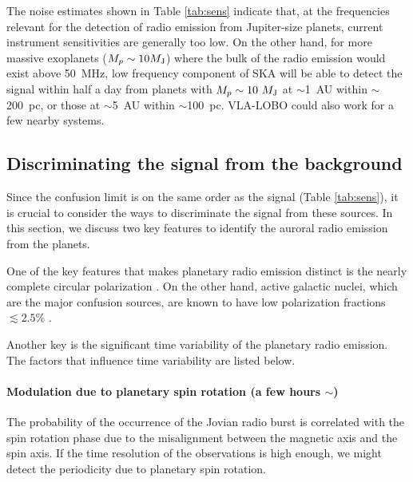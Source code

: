 \documentclass[iop,numberedappendix,apj]{emulateapj}
\begin{document}
The noise estimates shown in Table \ref{tab:sens} indicate that, at the frequencies relevant for the detection of radio emission from Jupiter-size planets, current instrument sensitivities are generally too low.
On the other hand, for more massive exoplanets ($M_p\sim 10 M_{\rm J}$) where the bulk of the radio emission would exist above 50~MHz, low frequency component of SKA will be able to detect the signal within half a day from planets with $M_p \sim 10~M_{\rm J}$ at $\sim$1~AU within $\sim $200~pc, or those at $\sim$5~AU within $\sim $100~pc. 
VLA-LOBO could also work for a few nearby systems. 




\subsection{Discriminating the signal from the background}
\label{ss:timevariability}


Since the confusion limit is on the same order as the signal (Table \ref{tab:sens}), it is crucial to consider the ways to discriminate the signal from these sources. 
In this section, we discuss two key features to identify the auroral radio emission from the planets. 

One of the key features that makes planetary radio emission distinct is the nearly  complete circular polarization \citep[e.g.][and reference therein]{dessler1983}. 
On the other hand, active galactic nuclei, which are the major confusion sources, are known to have low polarization fractions $\lesssim2.5\%$ \citep{Stil2014}. 

Another key is the significant time variability of the planetary radio emission. 
The factors that influence time variability are listed below. 

\paragraph{Modulation due to planetary spin rotation (a few hours $\sim $)}
The probability of the occurrence of the Jovian radio burst is correlated with the spin rotation phase \citep[e.g.][]{dessler1983} due to the misalignment between the magnetic axis and the spin axis. If the time resolution of the observations is high enough, we might detect the periodicity due to planetary spin rotation. 
%
\end{document}
